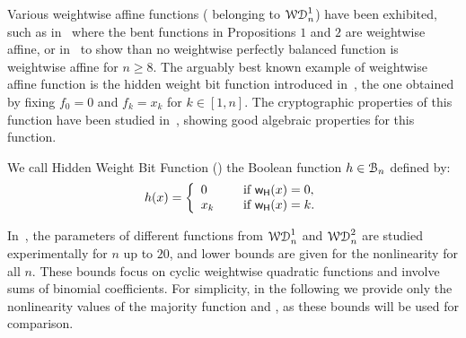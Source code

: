 \documentclass[11pt]{llncs}
\begin{document}
Various weightwise affine functions (\ie{} belonging to $\mathcal{WD}^{1}_{n}$) have been exhibited, such as in~\cite{TOSC:CarMeaRot17} where the bent functions in Propositions $1$ and $2$ are weightwise affine, or in~\cite{DAM:GinMea22} to show than no weightwise perfectly balanced function is weightwise affine for $n\geq 8$. 
The arguably best known example of weightwise affine function is the hidden weight bit function introduced in~\cite{IEEE:Bryant91}, the one obtained by fixing $f_0=0$ and $f_k=x_k$ for $k \in [1,n]$. The cryptographic properties of this function have been studied in~\cite{DAM:WCST14}, showing good algebraic properties for this function.

\begin{definition}\label{def:hwbf}
    We call Hidden Weight Bit Function (\hwbf{}) the Boolean function $h\in\mathcal{B}_n$ defined by:
	\[h(x)= \left\{ 
	\begin{array}{l l}
	0 & \quad \text{ if } \mathsf{w_H}(x) =0, \\
	x_k & \quad \text{ if } \mathsf{w_H}(x)=k.
	\end{array} \right. \] 

\end{definition}

In~\cite{DAM:MeaOza24}, the parameters of different functions from $\mathcal{WD}^{1}_{n}$ and $\mathcal{WD}^{2}_{n}$ are studied experimentally for $n$ up to $20$, and lower bounds are given for the nonlinearity for all $n$. 
These bounds focus on cyclic weightwise quadratic functions and involve sums of binomial coefficients. For simplicity, in the following we provide only the nonlinearity values of the majority function and \hwbf{}, as these bounds will be used for comparison.

\end{document}

